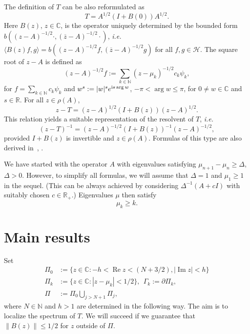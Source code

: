 The definition of $T$ can be also reformulated as
\begin{equation*}
T = A^{1/2}(I+B(0))A^{1/2}.
\end{equation*}
Here $B(z)$, $z \in {{\mathbb{C}}}$, is the operator uniquely determined by the bounded form $b((z-A)^{-1/2} \cdot,(\overline{z}-A)^{-1/2} \cdot)$, {{\emph{i.e.}}}~$\langle B(z)f,g \rangle = b((z-A)^{-1/2} f,(\overline{z}-A)^{-1/2} g) $ for all $f,g \in {{\mathcal{H}}}$. The square root of $z-A$ is defined as 
\begin{equation*}
(z-A)^{-1/2} f := \sum_{k \in {\mathbb{N}}} (z-\mu_k)^{-1/2} c_k \psi_k,
\end{equation*}
for $f = \sum_{k \in {\mathbb{N}}} c_k \psi_k$ and $w^s := |w|^s e^{{{\rm i}} s \arg w}$, $-\pi < \arg w \leq \pi$, for $0\neq w \in {{\mathbb{C}}}$ and $s\in {{\mathbb{R}}}$.
For all $z \in \rho(A)$, 
\begin{equation*}
z-T = (z-A)^{1/2}(I+B(z))(z-A)^{1/2}.
\end{equation*}
This relation yields a suitable representation of the resolvent of $T$, {{\emph{i.e.}}}~
\begin{equation}\label{Tz.res.dec}
(z-T)^{-1} = (z-A)^{-1/2}(I+B(z))^{-1}(z-A)^{-1/2},
\end{equation}
provided $I+B(z)$ is invertible and $z \in \rho(A)$. Formulas of this type are also derived in~\cite[Lem.1.]{Agranovich-1994-28}, \cite[Chap.VI.3.1.]{Kato-1966}.

\begin{remark}\label{rem.sim.as}
We have started with the operator $A$ with eigenvalues satisfying $\mu_{n+1} -\mu_n \geq \Delta$, $\Delta >0$. However, to simplify all formulas, we will assume that $\Delta=1$ and $\mu_1 \geq 1$ in the sequel.
(This can be always achieved by considering $\Delta^{-1}(A + c I)$ with suitably chosen $c \in {{\mathbb{R}}}_+$.) Eigenvalues $\mu$ then satisfy
\begin{equation}\label{mu.sim}
\mu_k \geq k.
\end{equation}

\end{remark}

\section{Main results}
\label{sec.main.res}

Set 
\begin{equation}\label{Pin.def}
\begin{aligned}
\Pi_0&:=\{ z \in {{\mathbb{C}}}: - h < {\operatorname{Re}} z <  (N+3/2), |{\operatorname{Im}} z| <  h\} \\
\Pi_k&:=\{ z \in {{\mathbb{C}}}: |z-\mu_k| < 1/2 \}, \ \ \Gamma_k:=\partial \Pi_k,\\
\Pi&:=\Pi_0 \bigcup_{j>N+1}\Pi_j,
\end{aligned}
\end{equation}
where $N \in {\mathbb{N}}$ and $h>1$ are determined in the following way. The aim is to localize the spectrum of $T$. We will succeed if we guarantee that $\|B(z)\|\leq 1/2$ for $z$ outside of $\Pi$. 

